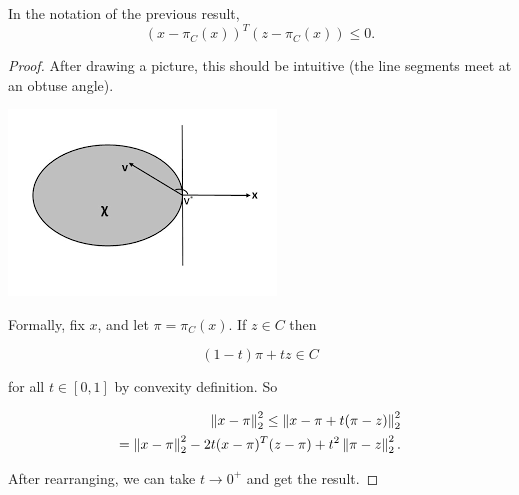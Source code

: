 \documentclass[11pt]{scrartcl}
\begin{document}
\begin{theorem}
\label{neggy convex thing}
In the notation of the previous result,
\begin{equation}
    (x - \pi_C(x))^T (z - \pi_C(x)) \le 0.
\end{equation}

\begin{proof}

After drawing a picture, this should be intuitive (the line segments meet at an obtuse angle).

\begin{center}
\includegraphics[scale=0.5]{proj.png}
\label{surrogates picture}
\end{center}

Formally, fix $x$, and let $\pi = \pi_C(x)$. If $z \in C$ then

\begin{equation}
    (1-t)\pi + tz \in C
\end{equation}

for all $t \in [0,1]$ by convexity definition. So

\begin{align}
    \left\lVert x-\pi\right\rVert_2^2 \le \left\lVert x-\pi + t(\pi - z)\right\rVert_2^2 \\
    = \left\lVert x-\pi\right\rVert_2^2 - 2t(x-\pi)^T (z-\pi) + t^2 \left\lVert\pi-z\right\rVert_2^2.
\end{align}

After rearranging, we can take $t \rightarrow 0^+$ and get the result.
\end{proof}
\label{proj negative}
\end{theorem}
\end{document}
